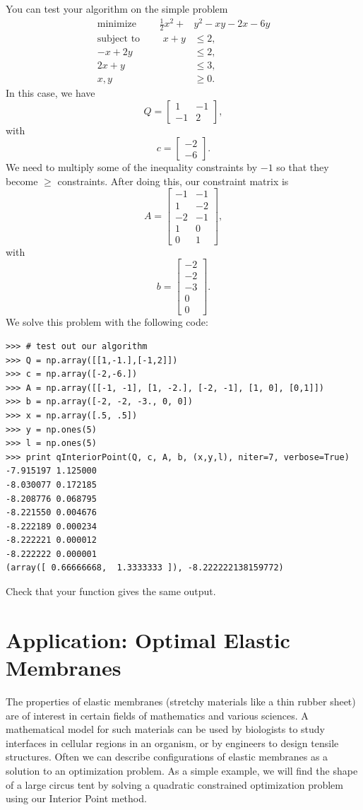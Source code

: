 You can test your algorithm on the simple problem
\begin{align*}
\text{minimize }\qquad \frac{1}{2}x^2 + &y^2 - xy - 2x - 6y\\
\text{subject to }\qquad x+y &\leq 2,\\
-x+2y &\leq 2,\\
2x+y&\leq 3,\\
x, y &\geq 0.
\end{align*}
In this case, we have
\[
Q = \begin{bmatrix}
1 & -1\\
-1 & 2
\end{bmatrix},
\]
with
\[
c = \begin{bmatrix}
-2\\
-6
\end{bmatrix}.
\]
We need to multiply some of the inequality constraints by $-1$ so that they become $\geq$ constraints.
After doing this, our constraint matrix is
\[
A = \begin{bmatrix}
-1 & -1\\
1 & -2\\
-2 & -1\\
1 & 0\\
0 & 1
\end{bmatrix},
\]
with
\[
b = \begin{bmatrix}
-2\\
-2\\
-3\\
0\\
0
\end{bmatrix}.
\]
We solve this problem with the following code:
\begin{lstlisting}
>>> # test out our algorithm
>>> Q = np.array([[1,-1.],[-1,2]])
>>> c = np.array([-2,-6.])
>>> A = np.array([[-1, -1], [1, -2.], [-2, -1], [1, 0], [0,1]])
>>> b = np.array([-2, -2, -3., 0, 0])
>>> x = np.array([.5, .5])
>>> y = np.ones(5)
>>> l = np.ones(5)
>>> print qInteriorPoint(Q, c, A, b, (x,y,l), niter=7, verbose=True)
-7.915197 1.125000
-8.030077 0.172185
-8.208776 0.068795
-8.221550 0.004676
-8.222189 0.000234
-8.222221 0.000012
-8.222222 0.000001
(array([ 0.66666668,  1.3333333 ]), -8.222222138159772)
\end{lstlisting}
Check that your function gives the same output.

\section*{Application: Optimal Elastic Membranes}
The properties of elastic membranes (stretchy materials like a thin rubber sheet) are of interest in
certain fields of mathematics and various sciences. A mathematical model for
such materials can be used by biologists to study interfaces in cellular regions in an organism, or by engineers
to design tensile structures. Often we can describe configurations of elastic membranes as a solution to an
optimization problem. As a simple example, we will find the shape of a large circus tent by solving a quadratic
constrained optimization problem using our Interior Point method.

